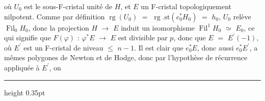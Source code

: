 \documentclass[9pt]{article}
\newcommand{\CanonText}[1]{\par{\fontsize{8.0}{9.35}\selectfont\RaggedRight #1\par}\vspace{2.2pt}}
\begin{document}
\begin{minipage}[t][\dimexpr\textheight-5pt\relax][t]{\textwidth}
\CanonText{où \(U_{0}\) est le sous-F-cristal unité de \(H\), et \(E\) un F-cristal topologiquement nilpotent. Comme par définition \(\operatorname{rg}(U_{0})\) \(=\) \(\operatorname{rg}.\text{st}(e_{0}^{*}H_{0})\) \(=\) \(h_{0}\), \(U_{0}\) relève \(\operatorname{Fil}_{0}H_{0}\), donc la projection \(H\) \(\to{}\) \(E\) induit un isomorphisme \(\operatorname{Fil}^{1}H_{0}\) \(\simeq{}\) \(E_{0}\), ce qui signifie que \(F(\varphi{})\) : \(\varphi{}^{*}E\) \(\to{}\) \(E\) est divisible par \(p\), donc que \(E\) \(=\) \(E^{\prime}(-1)\), où \(E^{\prime}\) est un F-cristal de niveau \(\leq{}\) \(n-1\). Il est clair que \(e_{0}^{*}E\), donc aussi \(e_{0}^{*}E^{\prime}\), a mêmes polygones de Newton et de Hodge, donc par l'hypothèse de récurrence appliquée à \(E^{\prime}\), on}
\vfill
{\color{Accent}\hrule height 0.35pt}\vspace{3pt}
\end{minipage}
\newpage
\end{document}

